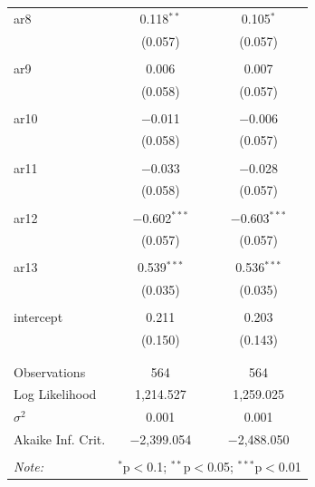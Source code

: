 \documentclass{article}
\begin{document}
\begin{table}[!htbp]
\begin{tabular}{@{\extracolsep{5pt}}lcc}
 ar8 & 0.118$^{**}$ & 0.105$^{*}$ \\ 
  & (0.057) & (0.057) \\ 
  & & \\ 
 ar9 & 0.006 & 0.007 \\ 
  & (0.058) & (0.057) \\ 
  & & \\ 
 ar10 & $-$0.011 & $-$0.006 \\ 
  & (0.058) & (0.057) \\ 
  & & \\ 
 ar11 & $-$0.033 & $-$0.028 \\ 
  & (0.058) & (0.057) \\ 
  & & \\ 
 ar12 & $-$0.602$^{***}$ & $-$0.603$^{***}$ \\ 
  & (0.057) & (0.057) \\ 
  & & \\ 
 ar13 & 0.539$^{***}$ & 0.536$^{***}$ \\ 
  & (0.035) & (0.035) \\ 
  & & \\ 
 intercept & 0.211 & 0.203 \\ 
  & (0.150) & (0.143) \\ 
  & & \\ 
\hline \\[-1.8ex] 
Observations & 564 & 564 \\ 
Log Likelihood & 1,214.527 & 1,259.025 \\ 
$\sigma^{2}$ & 0.001 & 0.001 \\ 
Akaike Inf. Crit. & $-$2,399.054 & $-$2,488.050 \\ 
\hline 
\hline \\[-1.8ex] 
\textit{Note:}  & \multicolumn{2}{r}{$^{*}$p$<$0.1; $^{**}$p$<$0.05; $^{***}$p$<$0.01} \\ 
\end{tabular} 
\end{table} 
\end{document}
